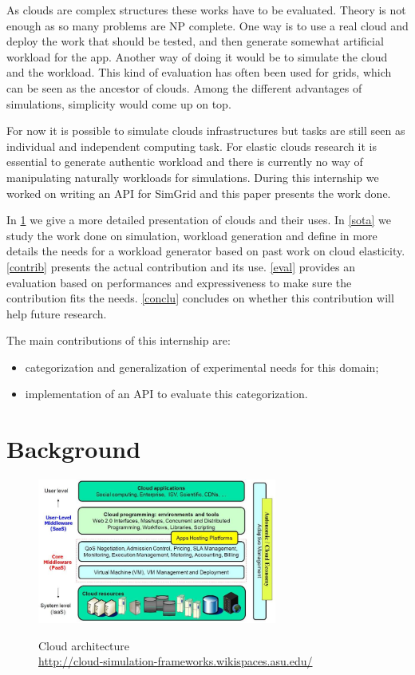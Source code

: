 \documentclass[a4paper, onecolumn, 11pt]{article}
\begin{document}
  As clouds are complex structures these works have to be evaluated. Theory is
  not enough as so many problems are NP complete. One way is to use a real cloud
  and deploy the work that should be tested, and then generate somewhat
  artificial workload for the app. Another way of doing it would be to simulate
  the cloud and the workload. This kind of evaluation has often been used for
  grids, which can be seen as the ancestor of clouds. Among the different
  advantages of simulations, simplicity would come up on top.
  
  For now it is possible to simulate clouds infrastructures but tasks are still
  seen as individual and independent computing task. For elastic clouds research
  it is essential to generate authentic workload and there is currently no way
  of manipulating naturally workloads for simulations. During this internship we
  worked on writing an API for SimGrid and this paper presents the work done.
  
  In \ref{background} we give a more detailed presentation of clouds and their 
  uses. In \ref{sota} we study the work done on simulation, workload generation 
  and define in more details the needs for a workload generator based on past 
  work on cloud elasticity. \ref{contrib} presents the actual contribution and 
  its use. \ref{eval} provides an evaluation based on performances and 
  expressiveness to make sure the contribution fits the needs. \ref{conclu} 
  concludes on whether this contribution will help future research.
  
  The main contributions of this internship are:
  \begin{itemize}
  	\item categorization and generalization of experimental needs for this 
  	domain;
  	\item implementation of an API to evaluate this categorization.
  \end{itemize}


\section{Background} \label{background}
  \begin{figure}
    \caption{Cloud architecture \\ 
    \url{http://cloud-simulation-frameworks.wikispaces.asu.edu/}}
    \centering
    \includegraphics[width=0.7\textwidth]{../plots/cloud_architecture}
    \label{cloud_arch}
  \end{figure}
  
\end{document}
